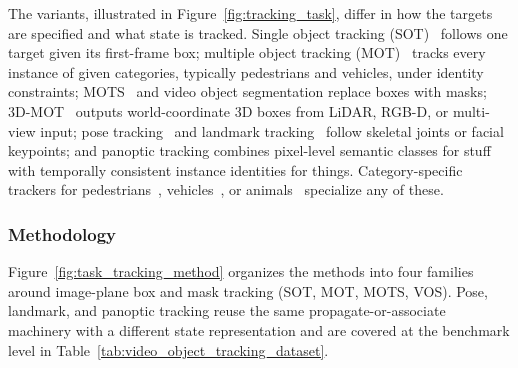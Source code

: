 The variants, illustrated in Figure~\ref{fig:tracking_task}, differ in how the targets are specified and what state is tracked. Single object tracking (SOT)~\cite{fan2019lasot,muller2018trackingnet} follows one target given its first-frame box; multiple object tracking (MOT)~\cite{milan2016mot16,dendorfer2020mot20,yu2020bdd100k} tracks every instance of given categories, typically pedestrians and vehicles, under identity constraints; MOTS~\cite{voigtlaender2019mots} and video object segmentation replace boxes with masks; 3D-MOT~\cite{AB3DMOT,yin2021center,caesar2020nuscenes,WaymoOpen-SunKDCPTGZCCVHN20} outputs world-coordinate 3D boxes from LiDAR, RGB-D, or multi-view input; pose tracking~\cite{andriluka2018posetrack,iqbal2017posetrack,samanta2016data} and landmark tracking~\cite{zafeiriou20173d} follow skeletal joints or facial keypoints; and panoptic tracking combines pixel-level semantic classes for stuff with temporally consistent instance identities for things. Category-specific trackers for pedestrians~\cite{stadler2021improving}, vehicles~\cite{van2001real}, or animals~\cite{zhang2023animaltrack} specialize any of these.


\subsubsection{Methodology}
Figure~\ref{fig:task_tracking_method} organizes the methods into four families around image-plane box and mask tracking (SOT, MOT, MOTS, VOS). Pose, landmark, and panoptic tracking reuse the same propagate-or-associate machinery with a different state representation and are covered at the benchmark level in Table~\ref{tab:video_object_tracking_dataset}.

